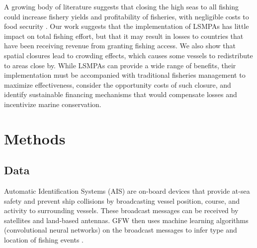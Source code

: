 \documentclass[9p,twocolumn,twoside,lineno]{pnas-new}
\begin{document}

A growing body of literature suggests that closing the high seas to all fishing could increase fishery yields and profitability of fisheries, with negligible costs to food security \citep{white_2014,sumaila_2015,sala_2018a,schiller_2018}. Our work suggests that the implementation of LSMPAs has little impact on total fishing effort, but that it may result in losses to countries that have been receiving revenue from granting fishing access. We also show that spatial closures lead to crowding effects, which causes some vessels to redistribute to areas close by. While LSMPAs can provide a wide range of benefits, their implementation must be accompanied with traditional fisheries management to maximize effectiveness, consider the opportunity costs of such closure, and identify sustainable financing mechanisms that would compensate losses and incentivize marine conservation.

\section{Methods}

\subsection{Data}

Automatic Identification Systems (AIS) are on-board devices that provide at-sea safety and prevent ship collisions by broadcasting vessel position, course, and activity to surrounding vessels. These broadcast messages can be received by satellites and land-based antennas. GFW then uses machine learning algorithms (convolutional neural networks) on the broadcast messages to infer type and location of fishing events \citep{kroodsma_2018}.
\end{document}
